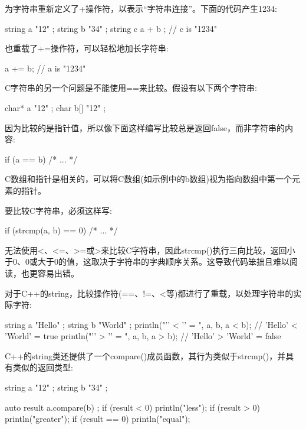 
为字符串重新定义了+操作符，以表示“字符串连接”。下面的代码产生1234:

\begin{cpp}
string a { "12" };
string b { "34" };
string c { a + b }; // c is "1234"
\end{cpp}

也重载了+=操作符，可以轻松地加长字符串:

\begin{cpp}
a += b; // a is "1234"
\end{cpp}


C字符串的另一个问题是不能使用==来比较。假设有以下两个字符串:

\begin{cpp}
char* a { "12" };
char b[] { "12" };
\end{cpp}

因为比较的是指针值，所以像下面这样编写比较总是返回false，而非字符串的内容:

\begin{cpp}
if (a == b) { /* ... */ }
\end{cpp}

C数组和指针是相关的，可以将C数组(如示例中的b数组)视为指向数组中第一个元素的指针。

要比较C字符串，必须这样写:

\begin{cpp}
if (strcmp(a, b) == 0) { /* ... */ }
\end{cpp}

无法使用<、<=、>=或>来比较C字符串，因此strcmp()执行三向比较，返回小于0、0或大于0的值，这取决于字符串的字典顺序关系。这导致代码笨拙且难以阅读，也更容易出错。

对于C++的string，比较操作符(==、!=、<等)都进行了重载，以处理字符串的实际字符:

\begin{cpp}
string a { "Hello" };
string b { "World" };
println("'{}' < '{}' = {}", a, b, a < b); // 'Hello' < 'World' = true
println("'{}' > '{}' = {}", a, b, a > b); // 'Hello' > 'World' = false
\end{cpp}

C++的string类还提供了一个compare()成员函数，其行为类似于strcmp()，并具有类似的返回类型:

\begin{cpp}
string a { "12" };
string b { "34" };

auto result { a.compare(b) };
if (result < 0) { println("less"); }
if (result > 0) { println("greater"); }
if (result == 0) { println("equal"); }
\end{cpp}

